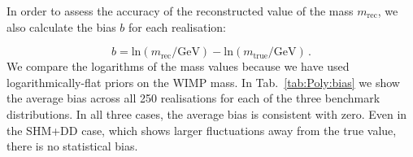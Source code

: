 In order to assess the accuracy of the reconstructed value of the mass $m_\textrm{rec}$, we also calculate the bias $b$ for each realisation:

\begin{equation}
\label{eq:Poly:bias}
b = \textrm{ln}(m_\textrm{rec} / \textrm{GeV}) - \textrm{ln}(m_\textrm{true} / \textrm{GeV})\,.
\end{equation}
We compare the logarithms of the mass values because we have used logarithmically-flat priors on the WIMP mass. In Tab.~\ref{tab:Poly:bias} we show the average bias across all 250 realisations for each of the three benchmark distributions. In all three cases, the average bias is consistent with zero. Even in the SHM+DD case, which shows larger fluctuations away from the true value, there is no statistical bias.

